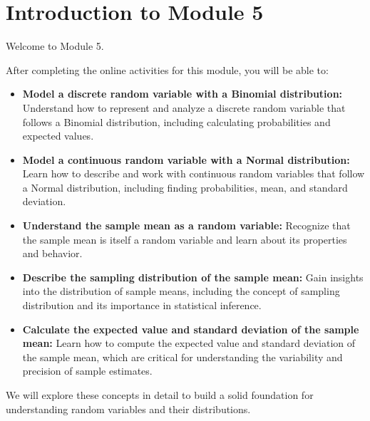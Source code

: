 \documentclass{article}
\begin{document}
\section*{Introduction to Module 5}

Welcome to Module 5.

After completing the online activities for this module, you will be able to:

\begin{itemize}
    \item \textbf{Model a discrete random variable with a Binomial distribution:} Understand how to represent and analyze a discrete random variable that follows a Binomial distribution, including calculating probabilities and expected values.
    
    \item \textbf{Model a continuous random variable with a Normal distribution:} Learn how to describe and work with continuous random variables that follow a Normal distribution, including finding probabilities, mean, and standard deviation.
    
    \item \textbf{Understand the sample mean as a random variable:} Recognize that the sample mean is itself a random variable and learn about its properties and behavior.
    
    \item \textbf{Describe the sampling distribution of the sample mean:} Gain insights into the distribution of sample means, including the concept of sampling distribution and its importance in statistical inference.
    
    \item \textbf{Calculate the expected value and standard deviation of the sample mean:} Learn how to compute the expected value and standard deviation of the sample mean, which are critical for understanding the variability and precision of sample estimates.
\end{itemize}

We will explore these concepts in detail to build a solid foundation for understanding random variables and their distributions.
\end{document}
